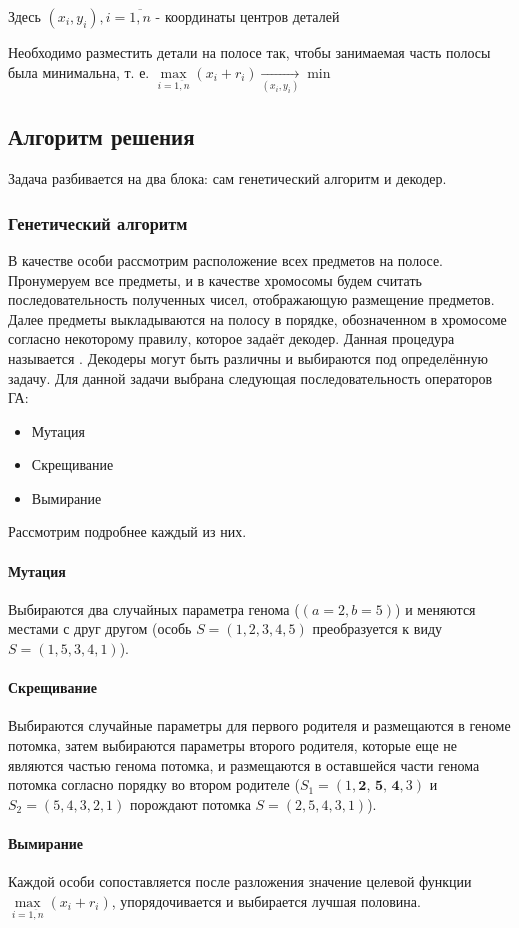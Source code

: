 Здесь ${(x_{i}, y_{i}),   i = \overline{1, n}}$ - координаты центров деталей

Необходимо разместить детали на полосе так, чтобы занимаемая часть полосы была минимальна, т. е. ${\max\limits_{i = \overline{1, n}}(x_{i} + r_{i})\xrightarrow[{(x_i, y_i)}]{} \min}$
\subsection{Алгоритм решения}
Задача разбивается на два блока: сам генетический алгоритм и декодер.
\subsubsection{Генетический алгоритм}
В качестве особи рассмотрим расположение всех предметов на полосе. Пронумеруем все предметы, и в качестве хромосомы будем считать последовательность полученных чисел, отображающую размещение предметов. Далее предметы выкладываются на полосу в порядке, обозначенном в хромосоме согласно некоторому правилу, которое задаёт декодер. Данная процедура называется . Декодеры могут быть различны и выбираются под определённую задачу. Для данной задачи выбрана следующая последовательность операторов ГА:
\begin{itemize}
\item Мутация
\item Скрещивание
\item Вымирание
\end{itemize}
Рассмотрим подробнее каждый из них.
\paragraph{Мутация}
Выбираются два случайных параметра генома ($(a = 2, b = 5)$) и меняются местами с друг другом (особь $S = (1, 2, 3, 4, 5) $ преобразуется к виду $S = (1, 5, 3, 4, 1)$).
\paragraph{Скрещивание}
Выбираются случайные параметры для первого родителя и размещаются в геноме потомка, затем выбираются параметры второго родителя, которые еще не являются частью генома потомка, и размещаются в оставшейся части генома потомка согласно порядку во втором родителе ($S_{1} = (1, \textbf{2, 5, 4}, 3)$ и $S_{2} = (5, 4, 3, 2, 1)$ порождают потомка $S = (2, 5, 4, 3, 1)$).
\paragraph{Вымирание}
Каждой особи сопоставляется после разложения значение целевой функции ${\max\limits_{i = \overline{1, n}}(x_{i} + r_{i})}$,  упорядочивается и выбирается лучшая половина.
